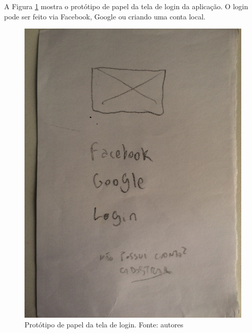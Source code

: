 A Figura \ref{img:prototipo_de_papel_tela_de_login} mostra o protótipo de papel da tela de login da aplicação. O login pode ser feito via Facebook, Google ou criando uma conta local.
\begin{figure}[H]
    \centering
    \includegraphics[scale=0.1, angle=-90]{figuras/prototipo_papel_login.jpg}
    \caption[Protótipo de papel da tela de login]{Protótipo de papel da tela de login. Fonte: autores}
    \label{img:prototipo_de_papel_tela_de_login}
\end{figure}
 \pagebreak

